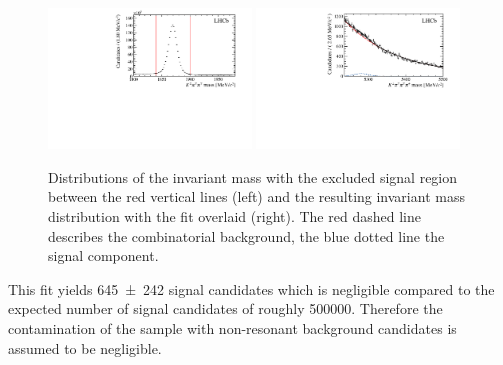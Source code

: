 \begin{figure}[tb]
    \centering
    \includegraphics[width=0.48\textwidth]{06selection/figs/DmassCut.pdf}
    \includegraphics[width=0.48\textwidth]{06selection/figs/Resulting_Bmass.pdf}
    \caption{Distributions of the invariant \Dm mass with the excluded signal region between the red vertical lines (left) and the resulting invariant \Bz mass distribution with the fit overlaid (right). The red dashed line describes the combinatorial background, the blue dotted line the signal component.}
    \label{fig:nonRes_Try2}
\end{figure}
This fit yields \num{645\pm242} signal candidates which is negligible compared to the expected number of \BdToDpi signal candidates of roughly \num{500000}.
Therefore the contamination of the sample with non-resonant background candidates is assumed to be negligible.
